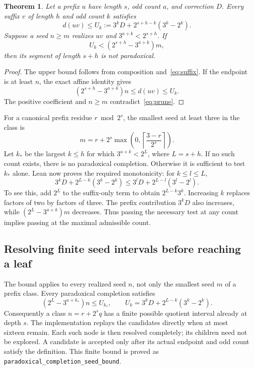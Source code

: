 \documentclass[11pt]{article}
\newtheorem{theorem}{Theorem}
\begin{document}
\begin{theorem}
Let a prefix $u$ have length $s$, odd count $a$, and correction $D$. Every suffix $v$ of length $h$ and odd count $k$ satisfies
\[
d(uv)\le U_k:=3^kD+2^{s+h-k}(3^k-2^k).
\]
Suppose a seed $n\ge m$ realizes $uv$ and $3^{a+k}<2^{s+h}$. If
\begin{equation}\label{eq:prune}
U_k<(2^{s+h}-3^{a+k})m,
\end{equation}
then its segment of length $s+h$ is not paradoxical.
\end{theorem}
\begin{proof}
The upper bound follows from composition and~\eqref{eq:suffix}. If the endpoint is at least $n$, the exact affine identity gives
\[
(2^{s+h}-3^{a+k})n\le d(uv)\le U_k.
\]
The positive coefficient and $n\ge m$ contradict~\eqref{eq:prune}.
\end{proof}
For a canonical prefix residue $r\bmod2^s$, the smallest seed at least three in the class is
\[
m=r+2^s\max\!\left(0,\left\lceil\frac{3-r}{2^s}\right\rceil\right).
\]
Let $k_*$ be the largest $k\le h$ for which $3^{a+k}<2^L$, where
$L=s+h$. If no such count exists, there is no paradoxical completion.
Otherwise it is sufficient to test $k_*$ alone. Lean now proves the required
monotonicity: for $k\le l\le L$,
\[
3^kD+2^{L-k}(3^k-2^k)\le3^lD+2^{L-l}(3^l-2^l).
\]
To see this, add $2^L$ to the suffix-only term to obtain
$2^{L-k}3^k$. Increasing $k$ replaces factors of two by factors of three.
The prefix contribution $3^kD$ also increases, while
$(2^L-3^{a+k})m$ decreases. Thus passing the necessary test at any count
implies passing at the maximal admissible count.

\subsection*{Resolving finite seed intervals before reaching a leaf}
The bound applies to every realized seed $n$, not only the smallest seed
$m$ of a prefix class. Every paradoxical completion satisfies
\[
(2^L-3^{a+k_*})n\le U_{k_*},\qquad
U_k=3^kD+2^{L-k}(3^k-2^k).
\]
Consequently a class $n=r+2^sq$ has a finite possible quotient interval
already at depth $s$. The implementation replays the candidates directly
when at most sixteen remain. Each such node is then resolved completely;
its children need not be explored. A candidate is accepted only after its
actual endpoint and odd count satisfy the definition. This finite bound
is proved as \texttt{paradoxical\_completion\_seed\_bound}.
\end{document}
